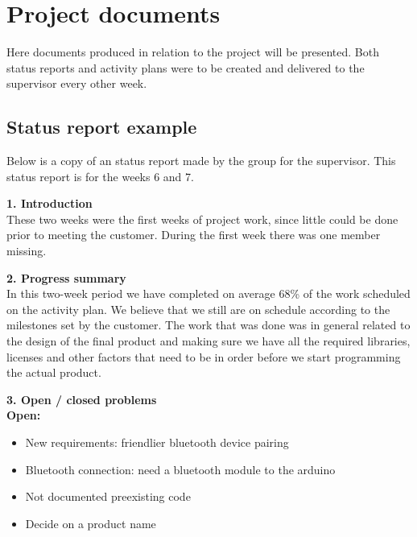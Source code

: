 \chapter{Project documents}
Here documents produced in relation to the project will be presented. Both status reports and activity plans were to be created and delivered to the supervisor every other week. 

\section{Status report example}
Below is a copy of an status report made by the group for the supervisor. This status report is for the weeks 6 and 7.\\
\newline

\textbf{1. Introduction}\\
These two weeks were the first weeks of project work, since little could be done prior to meeting the customer. During the first week there was one member missing.\\
\newline

\textbf{2. Progress summary}\\
In this two-week period we have completed on average 68\% of the work scheduled on the activity plan. We believe that we still are on schedule according to the milestones set by the customer. The work that was done was in general related to the design of the final product and making sure we have all the required libraries, licenses and other factors that need to be in order before we start programming the actual product.\\
\newline

\textbf{3. Open / closed problems}\\
\newline
\textbf{Open:}
\begin{itemize}
	\item{New requirements: friendlier bluetooth device pairing}
	\item{Bluetooth connection: need a bluetooth module to the arduino}
	\item{Not documented preexisting code}
	\item{Decide on a product name}
\end{itemize}
\vspace{8mm}

